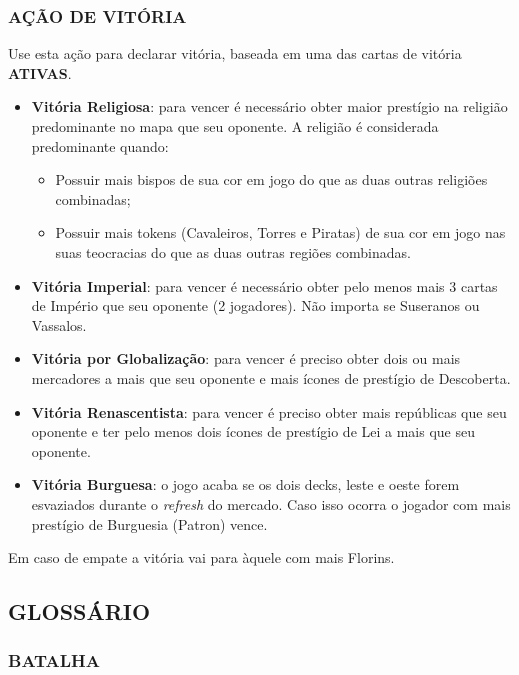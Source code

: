 \documentclass[11pt]{article}
\begin{document}
\subsubsection{AÇÃO DE VITÓRIA}
\label{sec:org4c958e3}

Use esta ação para declarar vitória, baseada em uma das cartas de vitória \textbf{ATIVAS}.

\begin{itemize}
\item \textbf{Vitória Religiosa}: para vencer é necessário obter maior prestígio na religião predominante no mapa que seu oponente. A religião é considerada predominante quando:
\begin{itemize}
\item Possuir mais bispos de sua cor em jogo do que as duas outras religiões combinadas;
\item Possuir mais tokens (Cavaleiros, Torres e Piratas) de sua cor em jogo nas suas teocracias do que as duas outras regiões combinadas.
\end{itemize}

\item \textbf{Vitória Imperial}: para vencer é necessário obter pelo menos mais 3 cartas de Império que seu oponente (2 jogadores). Não importa se Suseranos ou Vassalos.

\item \textbf{Vitória por Globalização}: para vencer é preciso obter dois ou mais mercadores a mais que seu oponente e mais ícones de prestígio de Descoberta.

\item \textbf{Vitória Renascentista}: para vencer é preciso obter mais repúblicas que seu oponente e ter pelo menos dois ícones de prestígio de Lei a mais que seu oponente.

\item \textbf{Vitória Burguesa}: o jogo acaba se os dois decks, leste e oeste forem esvaziados durante o \emph{refresh} do mercado. Caso isso ocorra o jogador com mais prestígio de Burguesia (Patron) vence.
\end{itemize}
Em caso de empate a vitória vai para àquele com mais Florins.


\subsection{GLOSSÁRIO}
\label{sec:org3687a63}

\subsubsection{BATALHA}
\label{sec:org60d2c09}
\end{document}
